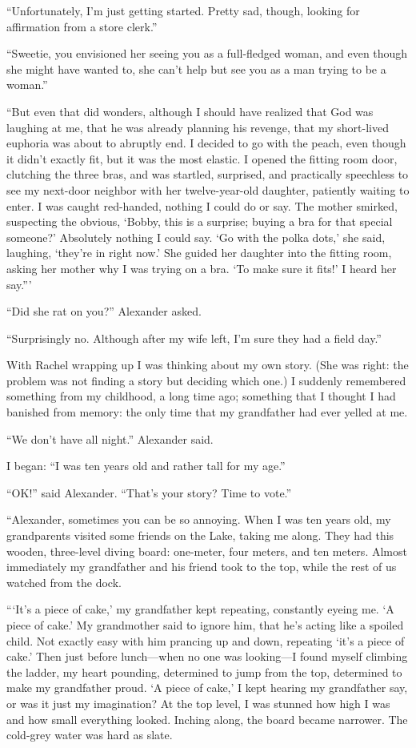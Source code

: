 ``Unfortunately, I'm just getting started. Pretty sad, though, looking
for affirmation from a store clerk.''

``Sweetie, you envisioned her seeing you as a full-fledged woman, and
even though she might have wanted to, she can't help but see you as a
man trying to be a woman.''

``But even that did wonders, although I should have realized that God
was laughing at me, that he was already planning his revenge, that my
short-lived euphoria was about to abruptly end. I decided to go with the
peach, even though it didn't exactly fit, but it was the most elastic. I
opened the fitting room door, clutching the three bras, and was
startled, surprised, and practically speechless to see my next-door
neighbor with her twelve-year-old daughter, patiently waiting to enter.
I was caught red-handed, nothing I could do or say. The mother smirked,
suspecting the obvious, `Bobby, this is a surprise; buying a bra for
that special someone?' Absolutely nothing I could say. `Go with the
polka dots,' she said, laughing, `they're in right now.' She guided her
daughter into the fitting room, asking her mother why I was trying on a
bra. `To make sure it fits!' I heard her say.'''

``Did she rat on you?'' Alexander asked.

``Surprisingly no. Although after my wife left, I'm sure they had a
field day.''

With Rachel wrapping up I was thinking about my own story. (She was
right: the problem was not finding a story but deciding which one.) I
suddenly remembered something from my childhood, a long time ago;
something that I thought I had banished from memory: the only time that
my grandfather had ever yelled at me.

``We don't have all night.'' Alexander said.

I began: ``I was ten years old and rather tall for my age.''

``OK!'' said Alexander. ``That's your story? Time to vote.''

``Alexander, sometimes you can be so annoying. When I was ten years old,
my grandparents visited some friends on the Lake, taking me along. They
had this wooden, three-level diving board: one-meter, four meters, and
ten meters. Almost immediately my grandfather and his friend took to the
top, while the rest of us watched from the dock.

```It's a piece of cake,' my grandfather kept repeating, constantly
eyeing me. `A piece of cake.' My grandmother said to ignore him, that
he's acting like a spoiled child. Not exactly easy with him prancing up
and down, repeating `it's a piece of cake.' Then just before
lunch---when no one was looking---I found myself climbing the ladder, my
heart pounding, determined to jump from the top, determined to make my
grandfather proud. `A piece of cake,' I kept hearing my grandfather say,
or was it just my imagination? At the top level, I was stunned how high
I was and how small everything looked. Inching along, the board became
narrower. The cold-grey water was hard as slate.

